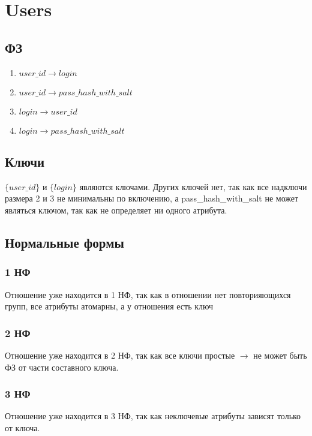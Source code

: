 \documentclass{article}
\begin{document}
\section{Users}

\subsection{ФЗ}
\begin{enumerate}
	\item $user\_id \rightarrow login$ 
	\item $user\_id \rightarrow pass\_hash\_with\_salt$ 
	\item $login \rightarrow user\_id$ 
	\item $login \rightarrow pass\_hash\_with\_salt$ 
\end{enumerate}

\subsection{Ключи}
$\{user\_id\}$ и $\{login\}$ являются ключами. Других ключей нет, так как все надключи размера 2 и 3 не минимальны по включению, а pass\_hash\_with\_salt не может являться ключом, так как не определяет ни одного атрибута.

\subsection{Нормальные формы}

\subsubsection{1 НФ}

Отношение уже находится в 1 НФ, так как в отношении нет повторияющихся групп, все атрибуты атомарны, а у отношения есть ключ

\subsubsection{2 НФ}

Отношение уже находится в 2 НФ, так как все ключи простые $\rightarrow$ не может быть ФЗ от части составного ключа.

\subsubsection{3 НФ}

Отношение уже находится в 3 НФ, так как неключевые атрибуты зависят только от ключа.
\end{document}
